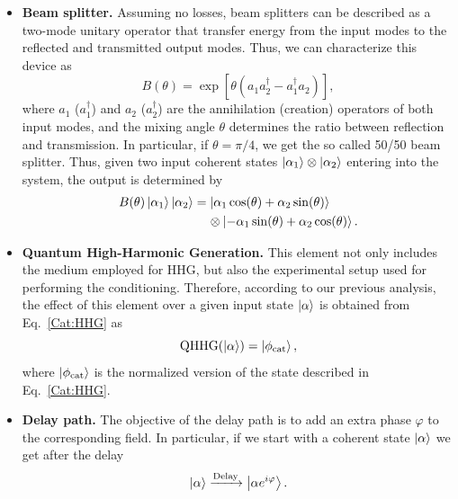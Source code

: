 \begin{itemize}
    \item \textbf{Beam splitter.} Assuming no losses, beam splitters can be described as a two-mode unitary operator that transfer energy from the input modes to the reflected and transmitted output modes. Thus, we can characterize this device as
    \begin{equation}
        B(\theta) = \exp[
                         \theta
                         (a_1a_2^\dagger 
                         - a_1^\dagger a_2)
                         ],
    \end{equation}
    where $a_1$ ($a_1^\dagger$) and $a_2$ ($a_2^\dagger$) are the annihilation (creation) operators of both input modes, and the mixing angle $\theta$ determines the ratio between reflection and transmission. In particular, if $\theta = \pi/4$, we get the so called 50/50 beam splitter. Thus, given two input coherent states $\ket{\alpha_1}\otimes\ket{\alpha_2}$ entering into the system, the output is determined by
    \begin{equation}
        \begin{aligned}
        B(\theta)\ket{\alpha_1}\ket{\alpha_2}
            &=\ket{\alpha_1 \cos(\theta) + \alpha_2 \sin(\theta)}\\
            &\hspace{0.4cm}\otimes
            \ket{-\alpha_1\sin(\theta) + \alpha_2 \cos(\theta)}.
        \end{aligned}
    \end{equation}
    
    \item \textbf{Quantum High-Harmonic Generation.} This element not only includes the medium employed for HHG, but also the experimental setup used for performing the conditioning. Therefore, according to our previous analysis, the effect of this element over a given input state $\ket{\alpha}$ is obtained from Eq.~\eqref{Cat:HHG} as
    \begin{equation}
        \text{QHHG}(\ket{\alpha})
             = \ket{\phi_\text{cat}},
    \end{equation}
    where $\ket{\phi_\text{cat}}$ is the normalized version of the state described in Eq.~\eqref{Cat:HHG}.
    
    \item \textbf{Delay path.} The objective of the delay path is to add an extra phase $\varphi$ to the corresponding field. In particular, if we start with a coherent state $\ket{\alpha}$ we get after the delay 
    \begin{equation}
        \ket{\alpha} 
            \xrightarrow[]{\text{Delay}}
                \ket{\alpha e^{i\varphi}}.
    \end{equation}
\end{itemize}

